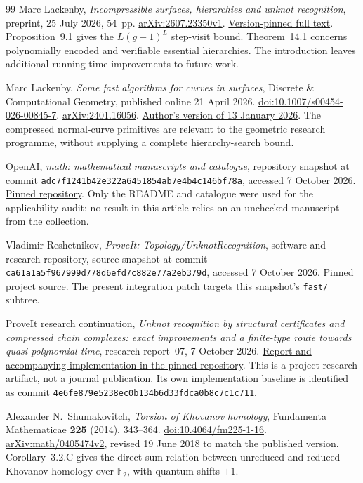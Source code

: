 \begin{thebibliography}{99}
Marc Lackenby,
\emph{Incompressible surfaces, hierarchies and unknot recognition},
preprint, 25 July 2026, 54~pp.
\href{https://arxiv.org/abs/2607.23350v1}{arXiv:2607.23350v1}.
\href{https://arxiv.org/html/2607.23350v1}{Version-pinned full text}.
Proposition~9.1 gives the $L(g+1)^L$ step-visit bound. Theorem~14.1
concerns polynomially encoded and verifiable essential hierarchies.
The introduction leaves additional running-time improvements to future work.

Marc Lackenby,
\emph{Some fast algorithms for curves in surfaces},
Discrete \& Computational Geometry, published online 21 April 2026.
\href{https://doi.org/10.1007/s00454-026-00845-7}{doi:10.1007/s00454-026-00845-7}.
\href{https://arxiv.org/abs/2401.16056}{arXiv:2401.16056}.
\href{https://people.maths.ox.ac.uk/lackenby/AlgorithmsSurfaces13jan26.pdf}{Author's version of 13 January 2026}.
The compressed normal-curve primitives are relevant to the geometric
research programme, without supplying a complete hierarchy-search bound.

OpenAI,
\emph{math: mathematical manuscripts and catalogue},
repository snapshot at commit
\texttt{adc7f1241b42e322a6451854ab7e4b4c146bf78a},
accessed 7 October 2026.
\href{https://github.com/openai/math/tree/adc7f1241b42e322a6451854ab7e4b4c146bf78a}{Pinned repository}.
Only the README and catalogue were used for the applicability audit;
no result in this article relies on an unchecked manuscript from the collection.

Vladimir Reshetnikov,
\emph{ProveIt: Topology/UnknotRecognition},
software and research repository, source snapshot at commit
\texttt{ca61a1a5f967999d778d6efd7c882e77a2eb379d},
accessed 7 October 2026.
\href{https://github.com/VladimirReshetnikov/ProveIt/tree/ca61a1a5f967999d778d6efd7c882e77a2eb379d/Topology/UnknotRecognition}{Pinned project source}.
The present integration patch targets this snapshot's \texttt{fast/} subtree.

ProveIt research continuation,
\emph{Unknot recognition by structural certificates and compressed chain
complexes: exact improvements and a finite-type route towards
quasi-polynomial time},
research report~07, 7 October 2026.
\href{https://github.com/VladimirReshetnikov/ProveIt/tree/ca61a1a5f967999d778d6efd7c882e77a2eb379d/Topology/UnknotRecognition/reports/07}{Report and accompanying implementation in the pinned repository}.
This is a project research artifact, not a journal publication. Its own
implementation baseline is identified as commit
\texttt{4e6fe879e5238ec0b134b6d33fdca0b8c7c1c711}.

Alexander N.~Shumakovitch,
\emph{Torsion of Khovanov homology},
Fundamenta Mathematicae \textbf{225} (2014), 343--364.
\href{https://doi.org/10.4064/fm225-1-16}{doi:10.4064/fm225-1-16}.
\href{https://arxiv.org/abs/math/0405474v2}{arXiv:math/0405474v2},
revised 19 June 2018 to match the published version.
Corollary~3.2.C gives the direct-sum relation between unreduced and reduced
Khovanov homology over $\mathbb F_2$, with quantum shifts $\pm1$.

\end{thebibliography}
